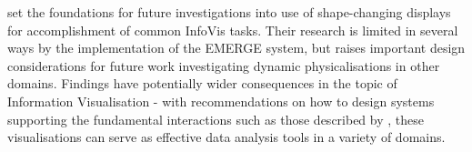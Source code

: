 \documentclass[11pt]{article}
\begin{document}
\citet{taher2015} set the foundations for future investigations into use of shape-changing displays for accomplishment of common InfoVis tasks. Their research is limited in several ways by the implementation of the EMERGE system, but raises important design considerations for future work investigating dynamic physicalisations in other domains. Findings have potentially wider consequences in the topic of Information Visualisation - with recommendations on how to design systems supporting the fundamental interactions such as those described by \citet{heer2012}, these visualisations can serve as effective data analysis tools in a variety of domains.


\newpage
\small

\normalsize
\end{document}
